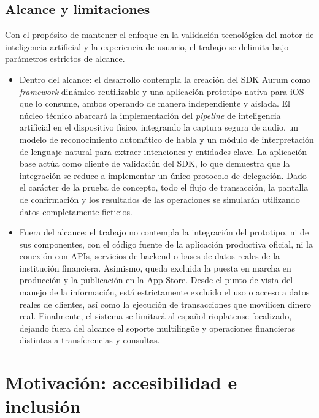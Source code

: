 \subsection{Alcance y limitaciones}

Con el propósito de mantener el enfoque en la validación tecnológica del motor de inteligencia artificial y la experiencia de usuario, el trabajo se delimita bajo parámetros estrictos de alcance.

\begin{itemize}
\item Dentro del alcance: el desarrollo contempla la creación del SDK Aurum como \textit{framework} dinámico reutilizable y una aplicación prototipo nativa para iOS que lo consume, ambos operando de manera independiente y aislada. El núcleo técnico abarcará la implementación del \textit{pipeline} de inteligencia artificial en el dispositivo físico, integrando la captura segura de audio, un modelo de reconocimiento automático de habla y un módulo de interpretación de lenguaje natural para extraer intenciones y entidades clave. La aplicación base actúa como cliente de validación del SDK, lo que demuestra que la integración se reduce a implementar un único protocolo de delegación. Dado el carácter de la prueba de concepto, todo el flujo de transacción, la pantalla de confirmación y los resultados de las operaciones se simularán utilizando datos completamente ficticios.

\item Fuera del alcance: el trabajo no contempla la integración del prototipo, ni de sus componentes, con el código fuente de la aplicación productiva oficial, ni la conexión con APIs, servicios de backend o bases de datos reales de la institución financiera. Asimismo, queda excluida la puesta en marcha en producción y la publicación en la App Store. Desde el punto de vista
del manejo de la información, está estrictamente excluido el uso o acceso a datos reales de clientes, así como la ejecución de transacciones que movilicen dinero real. Finalmente, el sistema se limitará al español rioplatense focalizado, dejando fuera del alcance el soporte multilingüe y operaciones financieras distintas a transferencias y consultas.
\end{itemize}


\section{Motivación: accesibilidad e inclusión}

